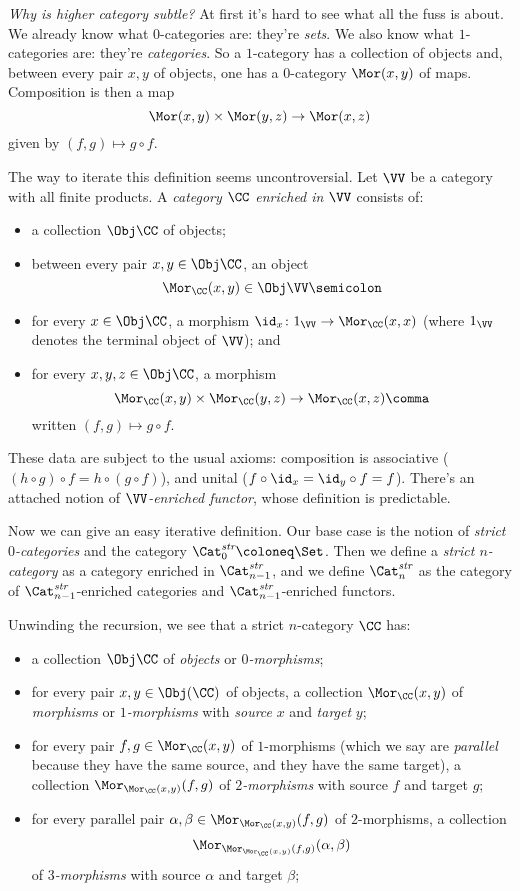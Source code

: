 \emph{Why is higher category subtle?}
At first it's hard to see what all the fuss is about.
We already know what $0$-categories are: they're \emph{sets}.
We also know what $1$-categories are: they're \emph{categories}.
So a $1$-category has a collection of objects and, between every pair $x,y$ of objects, one has a $0$-category $\Mor(x,y)$ of maps.
Composition is then a map
\[
  \Mor(x,y) \times \Mor(y,z) \to \Mor(x,z)
\]
given by $(f,g) \mapsto g \circ f$.

The way to iterate this definition seems uncontroversial.
Let $\VV$ be a category with all finite products.
A \emph{category $\CC$ enriched in $\VV$} consists of:
\begin{itemize}
  \item a collection $\Obj \CC$ of objects;
  \item between every pair $x,y \in \Obj \CC$, an object
  \[
    \Mor_{\CC}(x,y) \in \Obj \VV \semicolon
  \]
  \item for every $x \in \Obj \CC$, a morphism $\id_x \colon 1_{\VV} \to \Mor_{\CC}(x,x)$ (where $1_{\VV}$ denotes the terminal object of $\VV$); and
  \item for every $x,y,z \in \Obj \CC$, a morphism
    \[
      \Mor_{\CC}(x,y) \times \Mor_{\CC}(y,z) \to \Mor_{\CC}(x,z) \comma
    \]
    written $(f,g) \mapsto g \circ f$.
\end{itemize}
These data are subject to the usual axioms: composition is associative ($(h \circ g) \circ f = h \circ (g \circ f)$), and unital ($f \circ \id_x = \id_y \circ f = f$).
There's an attached notion of \emph{$\VV$-enriched functor}, whose definition is predictable.

Now we can give an easy iterative definition.
Our base case is the notion of \emph{strict $0$-categories} and the category $\Cat^{\textit{str}}_0 \coloneq \Set$.
Then we define a \emph{strict $n$-category} as a category enriched in $\Cat^{\textit{str}}_{n-1}$,
and we define $\Cat^{\textit{str}}_n$ as the category of $\Cat^{\textit{str}}_{n-1}$-enriched categories and $\Cat^{\textit{str}}_{n-1}$-enriched functors.

Unwinding the recursion, we see that a strict $n$-category $\CC$ has:
\begin{itemize}
  \item a collection $\Obj \CC$ of \emph{objects} or \emph{$0$-morphisms};
  \item for every pair $x,y \in \Obj(\CC)$ of objects, a collection $\Mor_{\CC}(x,y)$ of \emph{morphisms} or \emph{$1$-morphisms} with \emph{source} $x$ and \emph{target} $y$;
  \item for every pair $f,g \in \Mor_{\CC}(x,y)$ of $1$-morphisms (which we say are \emph{parallel} because they have the same source, and they have the same target), a collection $\Mor_{\Mor_{\CC}(x,y)}(f,g)$ of \emph{$2$-morphisms} with source $f$ and target $g$;
  \item for every parallel pair $\alpha,\beta \in \Mor_{\Mor_{\CC}(x,y)}(f,g)$ of $2$-morphisms, a collection
    \[
      \Mor_{\Mor_{\Mor_{\CC}(x,y)}(f,g)}(\alpha,\beta)
    \]
    of \emph{$3$-morphisms} with source $\alpha$ and target $\beta$;
\end{itemize}

